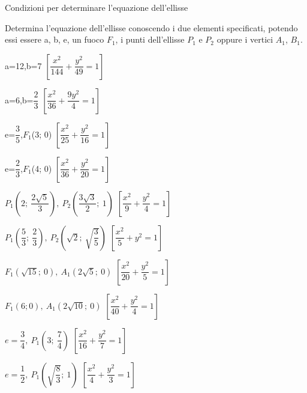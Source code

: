 Condizioni per determinare l'equazione dell'ellisse
\begin{esercizio}
  \label{ese:div.003}
  Determina l'equazione dell'ellisse conoscendo i due elementi 
specificati, potendo essi essere a, b, e, un fuoco $ F_{1}$, i punti 
dell'ellisse $ P_{1} $ e $ P_{2} $ oppure i vertici $ A_{1} $, $ B_{1} $.
  \begin{enumeratea}
   \item a=12,\quad b=7
   \hfill $\left[ \dfrac{x^{2}}{144} + \dfrac{y^{2}}{49} =1\right]$
   \item a=6,\quad b=$ \dfrac{2}{3} $
   \hfill $\left[ \dfrac{x^{2}}{36} + \dfrac{9y^{2}}{4} =1\right]$
   \item e=$ \dfrac{3}{5} $,\quad $ F_{1}$(3; 0)
   \hfill $\left[ \dfrac{x^{2}}{25} + \dfrac{y^{2}}{16} =1\right]$
   \item e=$ \dfrac{2}{3} $,\quad $ F_{1}$(4; 0)
   \hfill $\left[ \dfrac{x^{2}}{36} + \dfrac{y^{2}}{20} =1\right]$
   \item $ P_{1}  \left(2; ~ \dfrac{2\sqrt{5}}{3} \right),~  P_{2} \left( 
\dfrac{3\sqrt{3}}{2}; ~ 1\right)$
   \hfill $\left[ \dfrac{x^{2}}{9} + \dfrac{y^{2}}{4} =1\right]$
   \item $ P_{1} \left( \dfrac{5}{3} ; ~ \dfrac{2}{3} \right), ~  P_{2} 
\left( \sqrt{2} ; ~ \sqrt{\dfrac{3}{5}} \right)$
   \hfill $\left[ \dfrac{x^{2}}{5} + y^{2} =1\right]$
   \item $ F_{1}\left( \sqrt{15} ;~ 0\right),~ A_{1}\left(2 \sqrt{5} ;~ 
0\right)$
   \hfill $\left[\dfrac{x^{2}}{20} + \dfrac{y^{2}}{5} =1\right]$
   \item $ F_{1}(6; 0),~ A_{1}\left(2 \sqrt{10} ; ~0\right)$
   \hfill $\left[ \dfrac{x^{2}}{40} + \dfrac{y^{2}}{4} =1\right]$
   \item  $e= \dfrac{3}{4} ,~ P_{1}\left(3; ~ \dfrac{7}{4} \right)$
   \hfill  $\left[ \dfrac{x^{2}}{16} + \dfrac{y^{2}}{7} =1\right]$
   \item $e= \dfrac{1}{2} ,~ P_{1}\left( \sqrt{\dfrac{8}{3}} ;~ 1\right)$
   \hfill $\left[ \dfrac{x^{2}}{4} + \dfrac{y^{2}}{3} =1\right]$
  
  \end{enumeratea}
\end{esercizio}

% 
% 
